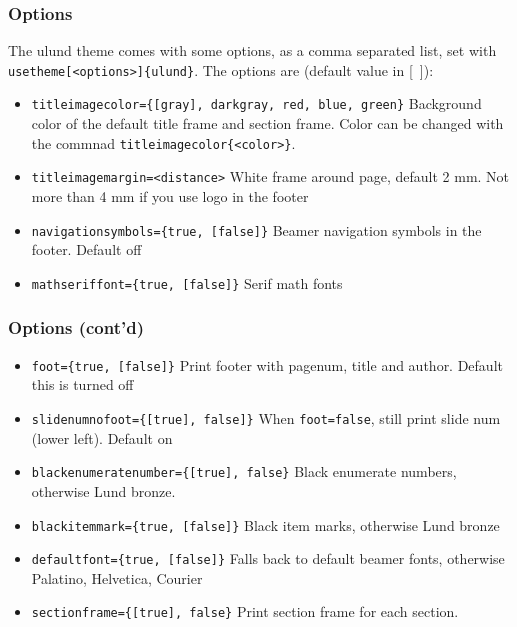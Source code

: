 \documentclass[aspectratio=1610]{beamer}
\def\txtbs{\symbol{92}}
\begin{document}
\begin{frame}%
  \frametitle{Options}
  The ulund theme comes with some options, as a comma separated list, set with
  \texttt{\txtbs usetheme[<options>]\{ulund\}}.\newline
  The options are (default value in [\ ]):
  \begin{itemize}
  \item \texttt{titleimagecolor=\{[gray], darkgray, red, blue, green\}}\newline
    Background color of the default title frame and section frame.\newline
    Color can be changed with the commnad \texttt{\txtbs titleimagecolor\{<color>\}}.
  \item \texttt{titleimagemargin=<distance>} \newline
    White frame around page, default 2 mm.\newline
    Not more than 4 mm if you use logo in the footer
  \item \texttt{navigationsymbols=\{true, [false]\}}\newline
    Beamer navigation symbols in the footer. Default off
  \item \texttt{mathseriffont=\{true, [false]\}}\newline
    Serif math fonts
  \end{itemize}
\end{frame}

\begin{frame}%
  \frametitle{Options (cont'd)}
  \begin{itemize}
  \item \texttt{foot=\{true, [false]\}}\newline
    Print footer with pagenum, title and author. Default this is turned off
  \item \texttt{slidenumnofoot=\{[true], false]\}}\newline
    When \texttt{foot=false}, still print slide num (lower left). Default on
  \item \texttt{blackenumeratenumber=\{[true], false\}}\newline
    Black enumerate numbers, otherwise Lund bronze.
  \item \texttt{blackitemmark=\{true, [false]\}}\newline
    Black item marks, otherwise Lund bronze
  \item \texttt{defaultfont=\{true, [false]\}}\newline
    Falls back to default beamer fonts, otherwise Palatino, Helvetica, Courier
  \item \texttt{sectionframe=\{[true], false\}}\newline
    Print section frame for each section. 
  \end{itemize}
\end{frame}
\end{document}
